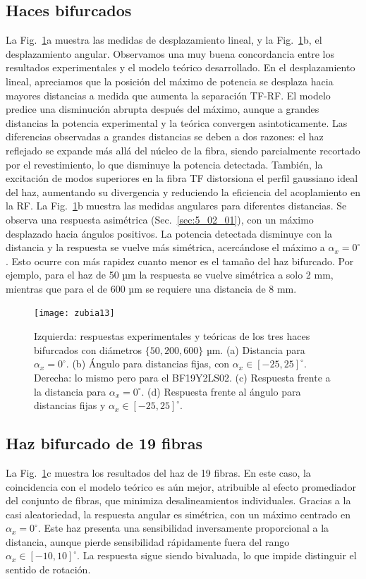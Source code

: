 \documentclass[11pt,a4paper]{article}
\begin{document}
\begin{multicols}{2}
\subsection{Haces bifurcados}
La Fig.~\ref{fig:5_13}a muestra las medidas de desplazamiento lineal, y la Fig.~\ref{fig:5_13}b, el desplazamiento angular. Observamos una muy buena concordancia entre los resultados experimentales y el modelo teórico desarrollado. En el desplazamiento lineal, apreciamos que la posición del máximo de potencia se desplaza hacia mayores distancias a medida que aumenta la separación TF-RF. El modelo predice una disminución abrupta después del máximo, aunque a grandes distancias la potencia experimental y la teórica convergen asintoticamente. Las diferencias observadas a grandes distancias se deben a dos razones: el haz reflejado se expande más allá del núcleo de la fibra, siendo parcialmente recortado por el revestimiento, lo que disminuye la potencia detectada. También, la excitación de modos superiores en la fibra TF distorsiona el perfil gaussiano ideal del haz, aumentando su divergencia y reduciendo la eficiencia del acoplamiento en la RF. La Fig.~\ref{fig:5_13}b muestra las medidas angulares para diferentes distancias. Se observa una respuesta asimétrica (Sec.~\ref{sec:5_02_01}), con un máximo desplazado hacia ángulos positivos. La potencia detectada disminuye con la distancia y la respuesta se vuelve más simétrica, acercándose el máximo a $\alpha_x = 0^\circ$. Esto ocurre con más rapidez cuanto menor es el tamaño del haz bifurcado. Por ejemplo, para el haz de 50 µm la respuesta se vuelve simétrica a solo 2 mm, mientras que para el de 600 µm se requiere una distancia de 8 mm.
\begin{figure}[t]
    \centering
    \texttt{[image: zubia13]}
    \caption{Izquierda: respuestas experimentales y teóricas de los tres haces bifurcados con diámetros $\{50,200,600\}$ µm. (a) Distancia para $\alpha_x = 0^\circ$. (b) Ángulo para distancias fijas, con $\alpha_x \in [-25, 25]^\circ$. Derecha: lo mismo pero para el BF19Y2LS02. (c) Respuesta frente a la distancia para $\alpha_x = 0^\circ$. (d) Respuesta frente al ángulo para distancias fijas y $\alpha_x \in [-25,25]^\circ$.}
    \label{fig:5_13}
\end{figure}
\subsection{Haz bifurcado de 19 fibras}
La Fig.~\ref{fig:5_13}c muestra los resultados del haz de 19 fibras. En este caso, la coincidencia con el modelo teórico es aún mejor, atribuible al efecto promediador del conjunto de fibras, que minimiza desalineamientos individuales. Gracias a la casi aleatoriedad, la respuesta angular es simétrica, con un máximo centrado en $\alpha_x=0^\circ$. Este haz presenta una sensibilidad inversamente proporcional a la distancia, aunque pierde sensibilidad rápidamente fuera del rango $\alpha_x \in [-10,10]^\circ$. La respuesta sigue siendo bivaluada, lo que impide distinguir el sentido de rotación.

\end{multicols}
\end{document}
